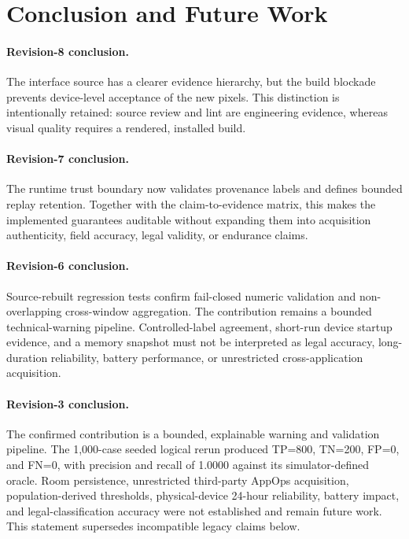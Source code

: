 \newpage
\section{Conclusion and Future Work}

\paragraph{Revision-8 conclusion.} The interface source has a clearer evidence hierarchy, but the build blockade prevents device-level acceptance of the new pixels. This distinction is intentionally retained: source review and lint are engineering evidence, whereas visual quality requires a rendered, installed build.

\paragraph{Revision-7 conclusion.} The runtime trust boundary now validates provenance labels and defines bounded replay retention. Together with the claim-to-evidence matrix, this makes the implemented guarantees auditable without expanding them into acquisition authenticity, field accuracy, legal validity, or endurance claims.

\paragraph{Revision-6 conclusion.} Source-rebuilt regression tests confirm fail-closed numeric validation and non-overlapping cross-window aggregation. The contribution remains a bounded technical-warning pipeline. Controlled-label agreement, short-run device startup evidence, and a memory snapshot must not be interpreted as legal accuracy, long-duration reliability, battery performance, or unrestricted cross-application acquisition.

\paragraph{Revision-3 conclusion.} The confirmed contribution is a bounded, explainable warning and validation pipeline. The 1,000-case seeded logical rerun produced TP=800, TN=200, FP=0, and FN=0, with precision and recall of 1.0000 against its simulator-defined oracle. Room persistence, unrestricted third-party AppOps acquisition, population-derived thresholds, physical-device 24-hour reliability, battery impact, and legal-classification accuracy were not established and remain future work. This statement supersedes incompatible legacy claims below.

